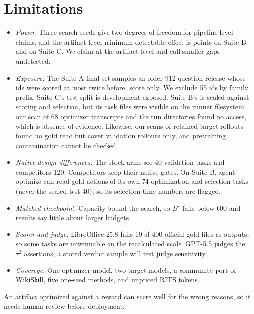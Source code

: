 \section{Limitations}
\label{sec:limitations}

\begin{itemize}[leftmargin=*,nosep]
\item \emph{Power.} Three search seeds give two degrees of freedom for pipeline-level claims, and the artifact-level minimum detectable effect is \mdeBCondThree{} points on Suite B and \mdeCCondThree{} on Suite C. We claim at the artifact level and call smaller gaps undetected.
\item \emph{Exposure.} The Suite A final set samples an older 912-question release whose ids were scored at most twice before, score only. We exclude 55 ids by family prefix. Suite C's test split is development-exposed. Suite B's is sealed against scoring and selection, but its task files were visible on the runner filesystem; our scan of 68 optimizer transcripts and the run directories found no access, which is absence of evidence. Likewise, our scans of retained target rollouts found no gold read but cover validation rollouts only, and pretraining contamination cannot be checked.
\item \emph{Native-design differences.} The stock \capevolve{} arms see 40 validation tasks and competitors 120. Competitors keep their native gates. On Suite B, agent-optimize can read gold actions of its own 74 optimization and selection tasks (never the sealed test 40), so its selection-time numbers are flagged.
\item \emph{Matched checkpoint.} Capacity bound the search, so $B^\star$ falls below 600 and results say little about larger budgets.
\item \emph{Scorer and judge.} LibreOffice 25.8 fails 19 of 400 official gold files as outputs, so some tasks are unwinnable on the recalculated scale. GPT-5.5 judges the $\tau^2$ assertions; a stored verdict sample will test judge sensitivity. 
\item \emph{Coverage.} One optimizer model, two target models, a community port of WikiSkill, five one-seed methods, and unpriced RITS tokens.
\end{itemize} An artifact optimized against a reward can score well for the wrong reasons, so it needs human review before deployment.
